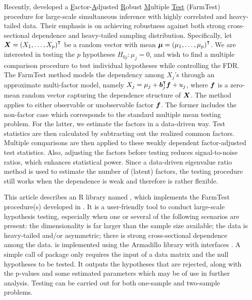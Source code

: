 Recently, \cite{FKSZ2017} developed a \underline{F}actor-\underline{A}djusted \underline{R}obust \underline{M}ultiple \underline{Test} (FarmTest) procedure for large-scale simultaneous inference with highly correlated and heavy-tailed data. Their emphasis is on achieving robustness against both strong cross-sectional dependence and heavy-tailed sampling distribution.
Specifically, let $\bm{X} =\left( X_1, \ldots , X_p \right)^\intercal$ be a random vector with mean $\bm{\mu}= \left( \mu_1,\ldots, \mu_p \right)^\intercal$. We are interested in testing the $p$ hypotheses $H_{0j} : \mu_j = 0$, and wish to find a multiple comparison procedure to test individual hypotheses while controlling the FDR. The FarmTest method models the dependency among $X_j$'s through an approximate multi-factor model, namely $X_j = \mu_j + \bm{b}_j^\intercal \bm f + u_j$, where $\bm f$ is a zero-mean random vector capturing the dependence structure of $\bm{X}$. The method applies to either observable or unobservable factor $\bm f$. 
The former includes the non-factor case which corresponds to the standard multiple mean testing problem. For the latter, we estimate the factors in a data-driven way.  Test statistics are then calculated by subtracting out the realized common factors. Multiple comparisons are then applied to these weakly dependent factor-adjusted test statistics. Also, adjusting the factors before testing reduces signal-to-noise ratios, which enhances statistical power.
Since a data-driven eigenvalue ratio method is used to estimate the number of (latent) factors, the testing procedure still works when the dependence is weak and therefore is rather flexible.   

This article describes an R library named , which implements the FarmTest procedure(s) developed in \cite{FKSZ2017}.
It is a user-friendly tool to conduct large-scale hypothesis testing, especially when one or several of the following scenarios are present: the dimensionality is far larger than the sample size available; the data is heavy-tailed and/or asymmetric; there is strong cross-sectional dependence among the data. 
 is implemented using the Armadillo library \citep{SC2016} with  interfaces \citep{EF2011, ES2014}.
A simple call of  package only requires the input of a data matrix and the null hypotheses to be tested. It outputs the hypotheses that are rejected, along with the p-values and some estimated parameters which may be of use in further analysis. Testing can be carried out for both one-sample and two-sample problems.




